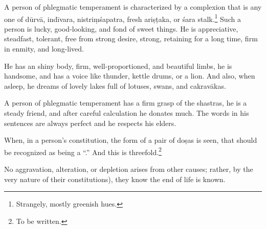 \begin{translation}
 \item[72]
 
 A person of phlegmatic temperament is characterized by a complexion that is any one of \gls{dūrvā}, \gls{indīvara}, \gls{nistriṃśapatra}, 
 fresh \gls{ariṣṭaka}, or \gls{śara} stalk.\footnote{Strangely, mostly greenish hues.}  Such a person is  lucky, good-looking, and fond of sweet things.  He is appreciative, steadfast, tolerant, free from strong desire, strong, 
     retaining for a long time, firm in enmity, and long-lived.
 
 
 \item[73]
 
 He has an shiny body, firm, well-proportioned, and beautiful limbs,
he is handsome, and has a voice like thunder, kettle drums, or a
lion. And also, when asleep, he dreams of lovely lakes full of
lotuses, swans, and \glspl{cakravāka}.
 
 \item[75]
 
 A person of phlegmatic temperament has a firm  grasp of the shastras,
he is a steady friend, and after careful calculation he donates much.
The words in his sentences are always perfect and he respects his
elders.

\item[77.add]

When, in a person’s constitution, the form of a pair of doṣas is seen, that should be recognized as being a “.” And this  is threefold.\footnote{To
     be written.}
 
\newpage
\begin{tt}
    \raggedright
    \bigskip
        
%





\item[78]

No aggravation, alteration, or depletion arises  from other causes; rather, by the very nature of their constitutions), they know the end of life is known.


\end{tt}
\end{translation}
